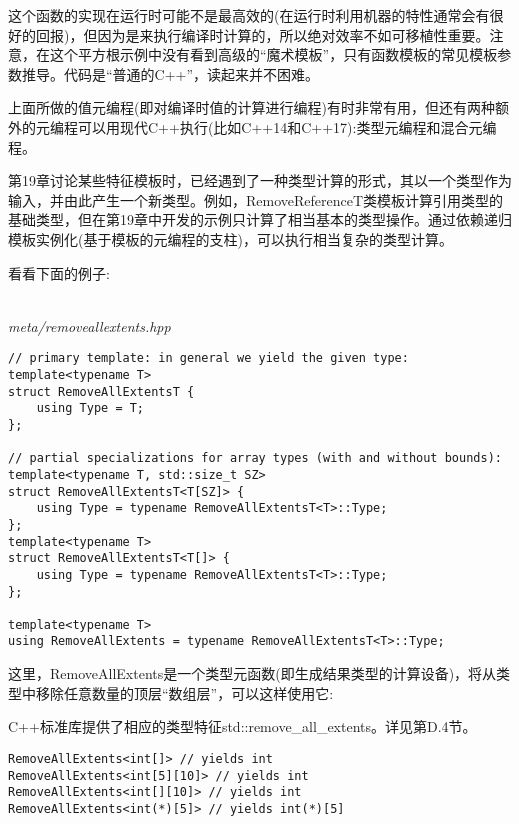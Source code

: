 这个函数的实现在运行时可能不是最高效的(在运行时利用机器的特性通常会有很好的回报)，但因为是来执行编译时计算的，所以绝对效率不如可移植性重要。注意，在这个平方根示例中没有看到高级的“魔术模板”，只有函数模板的常见模板参数推导。代码是“普通的C++”，读起来并不困难。

上面所做的值元编程(即对编译时值的计算进行编程)有时非常有用，但还有两种额外的元编程可以用现代C++执行(比如C++14和C++17):类型元编程和混合元编程。


第19章讨论某些特征模板时，已经遇到了一种类型计算的形式，其以一个类型作为输入，并由此产生一个新类型。例如，RemoveReferenceT类模板计算引用类型的基础类型，但在第19章中开发的示例只计算了相当基本的类型操作。通过依赖递归模板实例化(基于模板的元编程的支柱)，可以执行相当复杂的类型计算。

看看下面的例子:

\hspace*{\fill} \\ %
\noindent
\textit{meta/removeallextents.hpp}
\begin{lstlisting}[style=styleCXX]
// primary template: in general we yield the given type:
template<typename T>
struct RemoveAllExtentsT {
	using Type = T;
};

// partial specializations for array types (with and without bounds):
template<typename T, std::size_t SZ>
struct RemoveAllExtentsT<T[SZ]> {
	using Type = typename RemoveAllExtentsT<T>::Type;
};
template<typename T>
struct RemoveAllExtentsT<T[]> {
	using Type = typename RemoveAllExtentsT<T>::Type;
};

template<typename T>
using RemoveAllExtents = typename RemoveAllExtentsT<T>::Type;
\end{lstlisting}

这里，RemoveAllExtents是一个类型元函数(即生成结果类型的计算设备)，将从类型中移除任意数量的顶层“数组层”，可以这样使用它:

\begin{tcolorbox}[colback=webgreen!5!white,colframe=webgreen!75!black]
\hspace*{0.75cm}C++标准库提供了相应的类型特征std::remove\_all\_extents。详见第D.4节。
\end{tcolorbox}

\begin{lstlisting}[style=styleCXX]
RemoveAllExtents<int[]> // yields int
RemoveAllExtents<int[5][10]> // yields int
RemoveAllExtents<int[][10]> // yields int
RemoveAllExtents<int(*)[5]> // yields int(*)[5]
\end{lstlisting}

